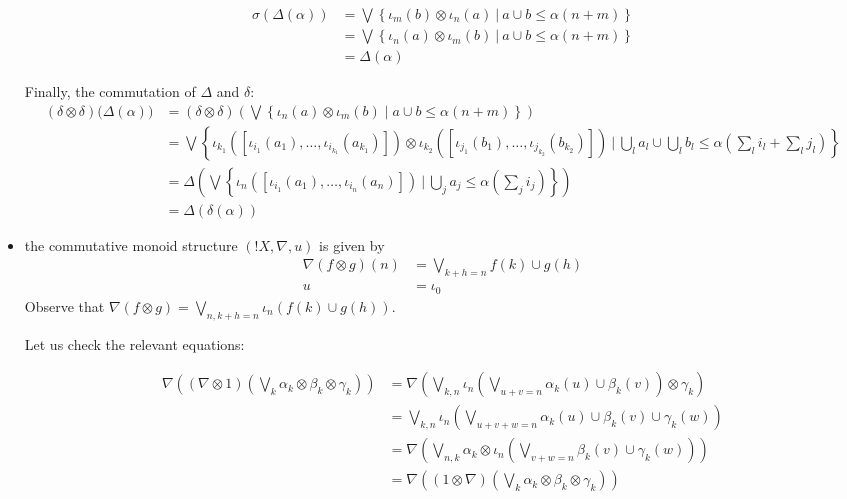 \begin{itemize}
{\small
\begin{align*}
\sigma(\Delta(\alpha)) & = 
\bigvee\left \{\iota_{m}(b)\otimes \iota_{n}(a)\ \Big \vert \ a\cup b \leq \alpha(n+m)\right\}
\\
& = 
\bigvee\left \{\iota_{n}(a)\otimes \iota_{m}(b)\ \Big \vert \ a\cup b \leq \alpha(n+m)\right\}
\\&= \Delta(\alpha)
\end{align*}
}

Finally, the commutation of $\Delta$ and $\delta$:
{\small
\begin{align*}
(\delta\otimes \delta)\Big(\Delta(\alpha)\Big) & =
(\delta\otimes\delta)\left(\bigvee
\left\{
\iota_{n}(a)\otimes \iota_{m}(b) \mid a\cup b \leq \alpha(n+m)
\right\}\right)\\
&=
\bigvee
\left \{\iota_{k_{1}}(
[\iota_{i_{1}}(a_{1}),\dots, \iota_{i_{k_{1}}}(a_{k_{1}})])\otimes
\iota_{k_{2}}(
[\iota_{j_{1}}(b_{1}),\dots, \iota_{j_{k_{2}}}(b_{k_{2}})]) \ \Bigg \vert \
\bigcup_{l}a_{l} \cup \bigcup_{l}b_{l} \leq \alpha\left (\sum_{l}i_{l}+\sum_{l}j_{l}\right)
\right\}
\\
&=
\Delta
\left(\bigvee\left \{
\iota_{n}(
[\iota_{i_{1}}(a_{1}),\dots, \iota_{i_{n}}(a_{n})]) \ \Bigg \vert \ 
\bigcup_{j}a_{j}\leq \alpha(\sum_{j}i_{j})
\right\}\right)
\\
& = \Delta(\delta(\alpha))
\end{align*}
}

\item the commutative monoid structure $(!X,\nabla,u)$ is given by 
\begin{align*}
\nabla( f \otimes g) (n)& = \bigvee_{k+h=n}f(k)\cup g(h) \\ 
u & =  \iota_{0}
\end{align*}
Observe that $\nabla(f\otimes g)=\bigvee_{n,k+h=n}\iota_{n}(f(k)\cup g(h))$.

Let us check the relevant equations:

{\small
\begin{align*}
\nabla\left((\nabla\otimes 1)\left(\bigvee_{k}\alpha_{k}\otimes \beta_{k}\otimes \gamma_{k}\right)\right) & =
\nabla \left(
\bigvee_{k,n}
\iota_{n}\left( \bigvee_{u+v=n}\alpha_{k}(u)\cup \beta_{k}(v)
\right)
\otimes \gamma_{k}
\right)\\
&=
\bigvee_{k,n}\iota_{n}\left( \bigvee_{u+v+w=n}
\alpha_{k}(u)\cup \beta_{k}(v)\cup \gamma_{k}(w)\right) \\
& =
\nabla \left(
\bigvee_{n,k}\alpha_{k}\otimes 
\iota_{n}\left( \bigvee_{v+w=n}\beta_{k}(v)\cup \gamma_{k}(w)\right)
\right)\\
&= 
\nabla\left((1\otimes\nabla)\left(\bigvee_{k}\alpha_{k}\otimes \beta_{k}\otimes \gamma_{k}\right)\right) 
\end{align*}
}


\end{itemize}
